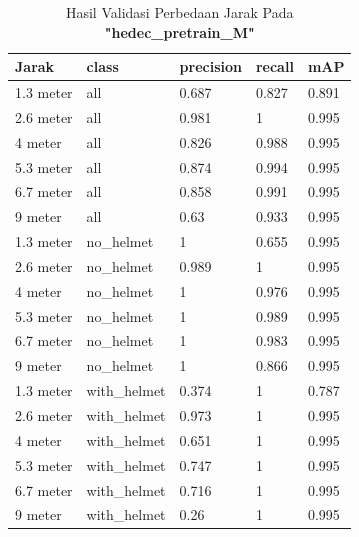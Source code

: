 \begin{enumerate}
  \begin{table}[ht]
    \centering
    \caption{Hasil Validasi Perbedaan Jarak Pada \textbf{"hedec\_pretrain\_M"}}
    \label{tb:hasiljarak_hedec_pretrain_M}
    \begin{tabular}{|l|l|l|l|l|} 
      \hline
      Jarak     & class        & precision & recall & mAP    \\ 
      \hline
      1.3 meter & all          & 0.687     & 0.827  & 0.891  \\
      2.6 meter & all          & 0.981     & 1      & 0.995  \\
      4 meter   & all          & 0.826     & 0.988  & 0.995  \\
      5.3 meter & all          & 0.874     & 0.994  & 0.995  \\
      6.7 meter & all          & 0.858     & 0.991  & 0.995  \\
      9 meter   & all          & 0.63      & 0.933  & 0.995  \\
      1.3 meter & no\_helmet   & 1         & 0.655  & 0.995  \\
      2.6 meter & no\_helmet   & 0.989     & 1      & 0.995  \\
      4 meter   & no\_helmet   & 1         & 0.976  & 0.995  \\
      5.3 meter & no\_helmet   & 1         & 0.989  & 0.995  \\
      6.7 meter & no\_helmet   & 1         & 0.983  & 0.995  \\
      9 meter   & no\_helmet   & 1         & 0.866  & 0.995  \\
      1.3 meter & with\_helmet & 0.374     & 1      & 0.787  \\
      2.6 meter & with\_helmet & 0.973     & 1      & 0.995  \\
      4 meter   & with\_helmet & 0.651     & 1      & 0.995  \\
      5.3 meter & with\_helmet & 0.747     & 1      & 0.995  \\
      6.7 meter & with\_helmet & 0.716     & 1      & 0.995  \\
      9 meter   & with\_helmet & 0.26      & 1      & 0.995  \\
      \hline
    \end{tabular}
  \end{table}


\end{enumerate}
